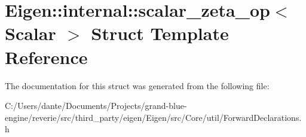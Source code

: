 \hypertarget{struct_eigen_1_1internal_1_1scalar__zeta__op}{}\section{Eigen\+::internal\+::scalar\+\_\+zeta\+\_\+op$<$ Scalar $>$ Struct Template Reference}
\label{struct_eigen_1_1internal_1_1scalar__zeta__op}


The documentation for this struct was generated from the following file\+:\begin{DoxyCompactItemize}
\item 
C\+:/\+Users/dante/\+Documents/\+Projects/grand-\/blue-\/engine/reverie/src/third\+\_\+party/eigen/\+Eigen/src/\+Core/util/Forward\+Declarations.\+h\end{DoxyCompactItemize}
